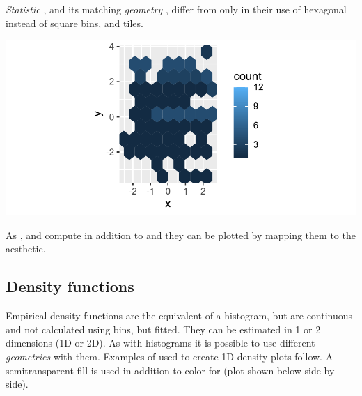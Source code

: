 \documentclass[krantz2]{krantz}\usepackage{knitr}
\begin{document}
\emph{Statistic} , and its matching \emph{geometry} , differ from  only in their use of hexagonal instead of square bins, and tiles.

\begin{knitrout}\footnotesize
{}\color{fgcolor}\begin{kframe}
\begin{alltt}
 \hlopt{+} \hlstd{(} \hlstd{=} \hlstd{)}
\end{alltt}
\end{kframe}

{\centering \includegraphics[width=.7\textwidth]{figure/pos-hex-plot-01-1} 

}


\end{knitrout}

As ,  and  compute  in addition to  and they can be plotted by mapping them to the  aesthetic.

\subsection{Density functions}\label{sec:plot:density}
Empirical density functions are the equivalent of a histogram, but are continuous and not calculated using bins, but fitted. They can be estimated in 1 or 2 dimensions (1D or 2D). As with histograms it is possible to use different \emph{geometries} with them. Examples of  used to create 1D density plots follow. A semitransparent fill is used in addition to color for  (plot shown below side-by-side).



\begin{knitrout}\footnotesize
{}\color{fgcolor}\begin{kframe}
\begin{alltt}
 \hlkwb{<-}
  \hlstd{(} 
        \hlstd{=} \hlstd{(}      \hlopt{+}
  \hlstd{(} \hlstd{=} \hlstd{)}
\end{alltt}
\end{kframe}
\end{knitrout}
\end{document}
